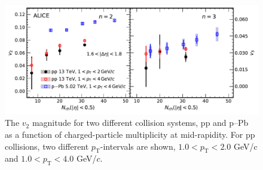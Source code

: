 \begin{figure}[h!]
	\centering
\includegraphics[width=1.0\textwidth]{figures/Fig6_v2Mult_allSystems_Data.pdf} 
	\caption{The $v_2$ magnitude for two different collision systems, pp and p--Pb as a function of charged-particle multiplicity at mid-rapidity. For pp collisions, two different $p_\mathrm{T}$-intervals are shown, $1.0<p_\mathrm{T}<2.0$ GeV/c and $1.0<p_\mathrm{T}<4.0$ GeV/$c$.} 
	\label{fig:v2mult}
\end{figure}

